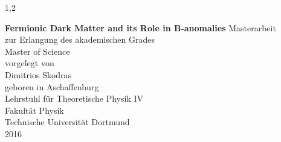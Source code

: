 \documentclass[11pt,a4paper,twoside]{article}
\numberwithin{equation}{section}
\begin{document}
\begin{spacing}{1,2}

%
%


\newcommand{\thetitle}{Fermionic Dark Matter and its Role in B-anomalies}

\thispagestyle{empty}
\begin{center}

\Huge\textbf{\thetitle}
\vfill
\vfill
\Large
Masterarbeit\\ zur Erlangung des akademischen Grades \\ Master of Science \\
\vspace{20pt}
\normalsize
vorgelegt von \\[5pt]
{\Large Dimitrios Skodras} \\[5pt]
geboren in Aschaffenburg \\
\vspace{20pt}
Lehrstuhl für Theoretische Physik IV \\ Fakultät Physik \\
Technische Universität Dortmund \\ 2016
\end{center}
\newpage


\end{spacing}
\end{document}
